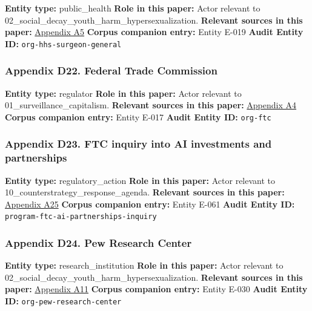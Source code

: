 \documentclass[
  american,
  11pt,
  letterpaper,
]{article}
\begin{document}
\textbf{Entity type:} public\_health \textbf{Role in this paper:} Actor
relevant to 02\_social\_decay\_youth\_harm\_hypersexualization.
\textbf{Relevant sources in this paper:}
\hyperref[ch-10-appendix-a5-social-media-and-youth-mental-health-the-u-s-surgeon-general-s-advisory]{Appendix
A5} \textbf{Corpus companion entry:} Entity E-019 \textbf{Audit Entity
ID:} \texttt{org-hhs-surgeon-general}

\subsubsection{Appendix D22. Federal Trade
Commission}\label{ch-10-appendix-d22-federal-trade-commission}

\textbf{Entity type:} regulator \textbf{Role in this paper:} Actor
relevant to 01\_surveillance\_capitalism. \textbf{Relevant sources in
this paper:}
\hyperref[ch-10-appendix-a4-a-look-behind-the-screens-examining-the-data-practices-of-social-media-and-video-streaming-services]{Appendix
A4} \textbf{Corpus companion entry:} Entity E-017 \textbf{Audit Entity
ID:} \texttt{org-ftc}

\subsubsection{Appendix D23. FTC inquiry into AI investments and
partnerships}\label{ch-10-appendix-d23-ftc-inquiry-into-ai-investments-and-partnerships}

\textbf{Entity type:} regulatory\_action \textbf{Role in this paper:}
Actor relevant to 10\_counterstrategy\_response\_agenda.
\textbf{Relevant sources in this paper:}
\hyperref[ch-10-appendix-a25-ftc-opens-inquiry-into-big-tech-s-partnerships-with-leading-ai-startups]{Appendix
A25} \textbf{Corpus companion entry:} Entity E-061 \textbf{Audit Entity
ID:} \texttt{program-ftc-ai-partnerships-inquiry}

\subsubsection{Appendix D24. Pew Research
Center}\label{ch-10-appendix-d24-pew-research-center}

\textbf{Entity type:} research\_institution \textbf{Role in this paper:}
Actor relevant to 02\_social\_decay\_youth\_harm\_hypersexualization.
\textbf{Relevant sources in this paper:}
\hyperref[ch-10-appendix-a11-social-media-seen-as-mostly-good-for-democracy-across-many-nations-but-u-s-is-a-major-outlier]{Appendix
A11} \textbf{Corpus companion entry:} Entity E-030 \textbf{Audit Entity
ID:} \texttt{org-pew-research-center}
\end{document}
